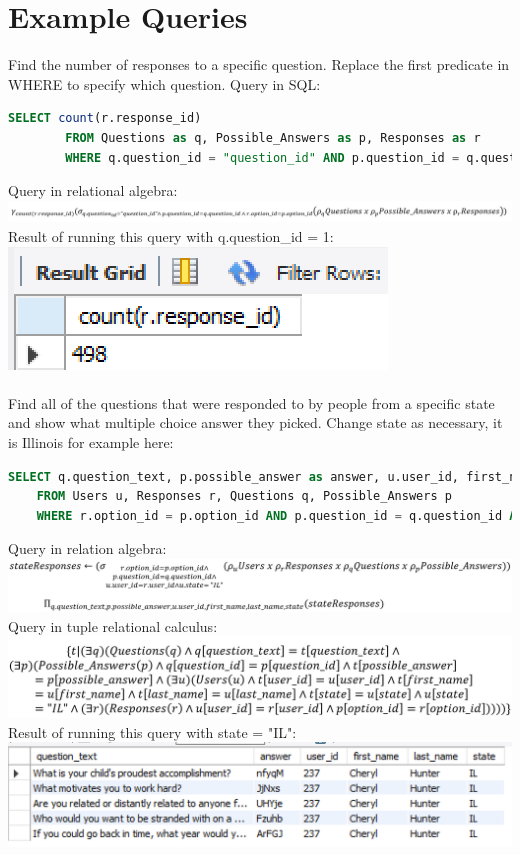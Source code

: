 \documentclass[12pt, oneside, a4paper]{article}
\begin{document}
    \section{Example Queries}
    Find the number of responses to a specific question. Replace the first predicate in WHERE to specify which question. Query in SQL:
    \begin{lstlisting}[language=SQL, columns=flexible, breaklines]
        SELECT count(r.response_id)
        FROM Questions as q, Possible_Answers as p, Responses as r
        WHERE q.question_id = "question_id" AND p.question_id = q.question_id AND r.option_id = p.option_id
    \end{lstlisting}
    Query in relational algebra:\\
    \includegraphics{responsecountqueryalgebra.PNG}
    Result of running this query with q.question\_id = 1:
    \includegraphics{responsecountquery.PNG}
    \\
    \\
    Find all of the questions that were responded to by people from a specific state and show what multiple choice answer they picked. Change state as necessary, it is Illinois for example here:
    \begin{lstlisting}[language=SQL, columns=flexible, breaklines]
    SELECT q.question_text, p.possible_answer as answer, u.user_id, first_name, last_name, state
    FROM Users u, Responses r, Questions q, Possible_Answers p
    WHERE r.option_id = p.option_id AND p.question_id = q.question_id AND u.user_id = r.user_id AND state = "IL";
    \end{lstlisting}
    Query in relation algebra: \\
    \includegraphics[scale=0.6]{questionstatequeryalgebra.PNG}
    Query in tuple relational calculus: \\
    \includegraphics[scale=0.7]{questionstatequerycalculus3.PNG}
    Result of running this query with state = "IL":\\
    \includegraphics{questionstatequeryresult.PNG}
\end{document}
